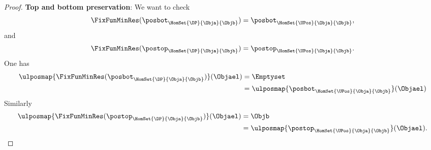 \begin{proof}
    \textbf{Top and bottom preservation}:
    We want to check
    \begin{equation}
        \FixFunMinRes(\posbot_{\HomSet{\DP}{\Obja}{\Objb}})=\posbot_{\HomSet{\UPos}{\Obja}{\Objb}},
    \end{equation}
    and
    \begin{equation}
        \FixFunMinRes(\postop_{\HomSet{\DP}{\Obja}{\Objb}})=\postop_{\HomSet{\UPos}{\Obja}{\Objb}}.
    \end{equation}
    One has
    \begin{equation}
        \begin{aligned}
            \ulposmap{\FixFunMinRes(\posbot_{\HomSet{\DP}{\Obja}{\Objb}})}(\Objael) & =\Emptyset \\
                                                                                    & =\ulposmap{\posbot_{\HomSet{\UPos}{\Obja}{\Objb}}}(\Objael)
        \end{aligned}
    \end{equation}
    Similarly
    \begin{equation}
        \begin{aligned}
            \ulposmap{\FixFunMinRes(\postop_{\HomSet{\DP}{\Obja}{\Objb}})}(\Objael) & =\Objb \\
                                                                                    & =\ulposmap{\postop_{\HomSet{\UPos}{\Obja}{\Objb}}}(\Objael).
        \end{aligned}
    \end{equation}
\end{proof}

